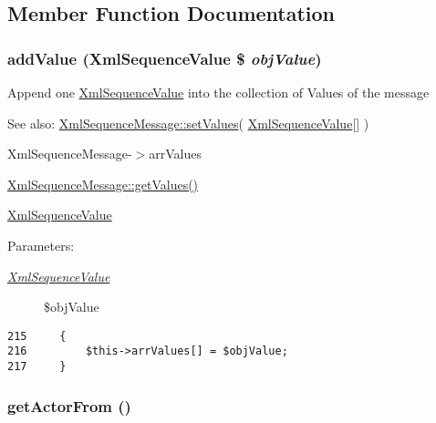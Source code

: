 \subsection{Member Function Documentation}
\hypertarget{class_xml_sequence_message_ac0ca1155cee0f020e42c4eda522c89e}{
\subsubsection[{addValue}]{\setlength{\rightskip}{0pt plus 5cm}addValue ({\bf XmlSequenceValue} \$ {\em objValue})}}
\label{class_xml_sequence_message_ac0ca1155cee0f020e42c4eda522c89e}


Append one \hyperlink{class_xml_sequence_value}{XmlSequenceValue} into the collection of Values of the message

\begin{Desc}
\item[See also:]\hyperlink{class_xml_sequence_message_18c41e77a9f42da10d074cda0ea308fe}{XmlSequenceMessage::setValues}( \hyperlink{class_xml_sequence_value}{XmlSequenceValue}\mbox{[}\mbox{]} ) 

XmlSequenceMessage-$>$arrValues 

\hyperlink{class_xml_sequence_message_70a0fe08035189260c72e32a9e20d30c}{XmlSequenceMessage::getValues()} 

\hyperlink{class_xml_sequence_value}{XmlSequenceValue} \end{Desc}
\begin{Desc}
\item[Parameters:]
\begin{description}
\item[{\em \hyperlink{class_xml_sequence_value}{XmlSequenceValue}}]\$objValue \end{description}
\end{Desc}


\begin{Code}\begin{verbatim}215     {
216         $this->arrValues[] = $objValue;
217     }
\end{verbatim}
\end{Code}


\hypertarget{class_xml_sequence_message_246c4363396d243058a9decdba3c7851}{
\subsubsection[{getActorFrom}]{\setlength{\rightskip}{0pt plus 5cm}getActorFrom ()}}
\label{class_xml_sequence_message_246c4363396d243058a9decdba3c7851}


